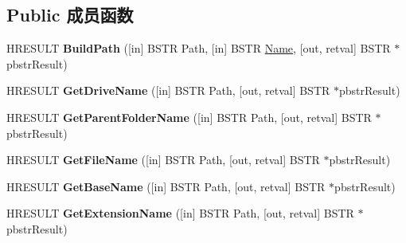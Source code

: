 \subsection*{Public 成员函数}
\begin{DoxyCompactItemize}
\item 
\mbox{\label{interface_scripting_1_1_i_file_system_a6c328afaee43115813cfc755b9b4f605}} 
H\+R\+E\+S\+U\+LT {\bfseries Build\+Path} (\mbox{[}in\mbox{]} B\+S\+TR Path, \mbox{[}in\mbox{]} B\+S\+TR \hyperlink{struct_name_rec__}{Name}, \mbox{[}out, retval\mbox{]} B\+S\+TR $\ast$pbstr\+Result)
\item 
\mbox{\label{interface_scripting_1_1_i_file_system_ab120dbf01011baa160500a656b87105c}} 
H\+R\+E\+S\+U\+LT {\bfseries Get\+Drive\+Name} (\mbox{[}in\mbox{]} B\+S\+TR Path, \mbox{[}out, retval\mbox{]} B\+S\+TR $\ast$pbstr\+Result)
\item 
\mbox{\label{interface_scripting_1_1_i_file_system_a2d38a737248223e52adb619c485300a2}} 
H\+R\+E\+S\+U\+LT {\bfseries Get\+Parent\+Folder\+Name} (\mbox{[}in\mbox{]} B\+S\+TR Path, \mbox{[}out, retval\mbox{]} B\+S\+TR $\ast$pbstr\+Result)
\item 
\mbox{\label{interface_scripting_1_1_i_file_system_ac8ef9c3b212b20cd9a10c1dcd32a562e}} 
H\+R\+E\+S\+U\+LT {\bfseries Get\+File\+Name} (\mbox{[}in\mbox{]} B\+S\+TR Path, \mbox{[}out, retval\mbox{]} B\+S\+TR $\ast$pbstr\+Result)
\item 
\mbox{\label{interface_scripting_1_1_i_file_system_ae0ac507c509ff2a3ab62a1f5676b8fc7}} 
H\+R\+E\+S\+U\+LT {\bfseries Get\+Base\+Name} (\mbox{[}in\mbox{]} B\+S\+TR Path, \mbox{[}out, retval\mbox{]} B\+S\+TR $\ast$pbstr\+Result)
\item 
\mbox{\label{interface_scripting_1_1_i_file_system_accfe21deb82b3c1c8fe8710ee84d6539}} 
H\+R\+E\+S\+U\+LT {\bfseries Get\+Extension\+Name} (\mbox{[}in\mbox{]} B\+S\+TR Path, \mbox{[}out, retval\mbox{]} B\+S\+TR $\ast$pbstr\+Result)
\item 
\mbox{\label{interface_scripting_1_1_i_file_system_a7dfa0ba5010284703b3cffb141671675}} 

\end{DoxyCompactItemize}
